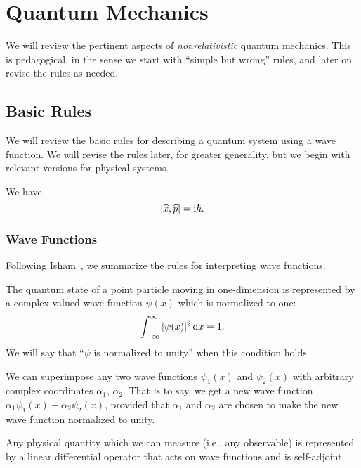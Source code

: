 \chapter{Quantum Mechanics}

\M We will review the pertinent aspects of \emph{nonrelativistic} quantum
mechanics. This is pedagogical, in the sense we start with ``simple but wrong''
rules, and later on revise the rules as needed.

\section{Basic Rules}\label{sec:qm:basic-rules}

\M We will review the basic rules for describing a quantum system using
a wave function. We will revise the rules later, for greater generality,
but we begin with relevant versions for physical systems.

We have
\begin{equation}\label{eq:position-momentum-uncertainty-commutator}
[\widehat{x},\widehat{p}] = \mathrm{i}\hbar.
\end{equation}


\subsection{Wave Functions}

\M Following Isham~\cite{Isham:1995lq}, we summarize the rules for
interpreting wave functions.

The quantum state of a point particle moving in one-dimension is
represented by a complex-valued wave function $\psi(x)$ which is
normalized to one:
\begin{equation}
\int^{\infty}_{-\infty}|\psi(x)|^{2}\,\mathrm{d} x = 1.
\end{equation}
We will say that ``$\psi$ is normalized to unity'' when this condition holds.

We can superimpose any two wave functions $\psi_{1}(x)$ and
$\psi_{2}(x)$ with arbitrary complex coordinates $\alpha_{1}$, $\alpha_{2}$.
That is to say, we get a new wave function
$\alpha_{1}\psi_{1}(x) + \alpha_{2}\psi_{2}(x)$, provided that
$\alpha_{1}$ and $\alpha_{2}$ are chosen to make the new wave function
normalized to unity.

Any physical quantity which we can measure (i.e., any observable) is
represented by a linear differential operator that acts on wave functions
and is self-adjoint.

